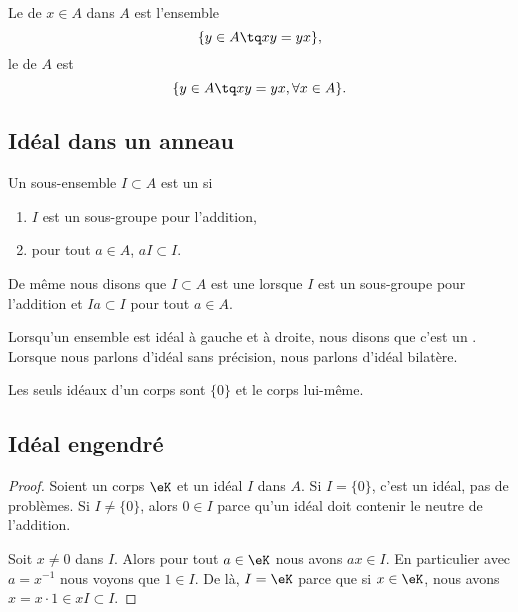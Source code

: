 \begin{definition}
	Le  de \( x\in A\) dans \( A\) est l'ensemble
	\begin{equation}
		\{ y\in A\tq xy=yx \},
	\end{equation}
	le  de \( A\) est
	\begin{equation}
		\{ y\in A\tq xy=yx,\forall x\in A \}.
	\end{equation}
\end{definition}

\subsection{Idéal dans un anneau}

\begin{definition}  \label{DefooQULAooREUIU}
	Un sous-ensemble \( I\subset A\) est un  si
	\begin{enumerate}
		\item
		      \( I\) est un sous-groupe pour l'addition,
		\item
		      pour tout \( a\in A\), \( aI\subset I\).
	\end{enumerate}
	De même nous disons que \( I\subset A\) est une  lorsque \( I\) est un sous-groupe pour l'addition et \( Ia\subset I\) pour tout \( a\in A\).

	Lorsqu'un ensemble est idéal à gauche et à droite, nous disons que c'est un . Lorsque nous parlons d'idéal sans précision, nous parlons d'idéal bilatère.
\end{definition}


\begin{lemma}		\label{LEMooMAHXooXSowdn}
	Les seuls idéaux d'un corps sont \( \{ 0 \}\) et le corps lui-même.
\end{lemma}

\subsection{Idéal engendré}


\begin{proof}
	Soient un corps \( \eK\) et un idéal \( I\) dans \( A\). Si \( I=\{ 0 \}\), c'est un idéal, pas de problèmes. Si \( I\neq\{ 0 \}\), alors \( 0\in I\) parce qu'un idéal doit contenir le neutre de l'addition.

	Soit \( x\neq 0\) dans \( I\). Alors pour tout \( a\in \eK\) nous avons \( ax\in I\). En particulier avec \( a=x^{-1}\) nous voyons que \( 1\in I\). De là, \( I=\eK\) parce que si \( x\in \eK\), nous avons \( x=x\cdot 1\in xI\subset I\).
\end{proof}

